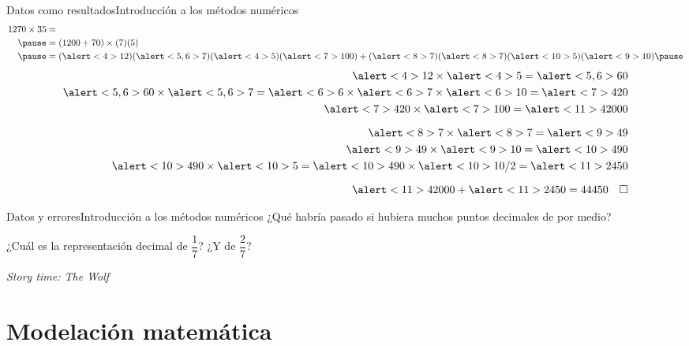 \documentclass[spanish, c]{beamer}
\begin{document}
\begin{frame}{Datos como resultados}{Introducción a los métodos numéricos}
    \begin{align*}
        1270 \times 35 & = \\ \pause
        & = (1200 + 70) \times (7)(5) \\ \pause
        & = (\alert<4>{12})(\alert<5,6>{7})(\alert<4>{5})(\alert<7>{100}) + (\alert<8>{7})(\alert<8>{7})(\alert<10>{5})(\alert<9>{10}) \pause
    \end{align*}
    \vspace{-2ex}
    \begin{align*}
        \alert<4>{12} \times \alert<4>{5} = \alert<5,6>{60} \\
        \alert<5,6>{60} \times \alert<5,6>{7} = \alert<6>{6} \times \alert<6>{7} \times \alert<6>{10} = \alert<7>{420} \\
        \alert<7>{420} \times \alert<7>{100} = \alert<11>{42000} \\[1.5ex]
        \alert<8>{7} \times \alert<8>{7} = \alert<9>{49} \\
        \alert<9>{49} \times \alert<9>{10} = \alert<10>{490} \\
        \alert<10>{490} \times \alert<10>{5} = \alert<10>{490} \times \alert<10>{10 / 2} = \alert<11>{2450}\\[1.5ex]
        \alert<11>{42000} + \alert<11>{2450} = 44450 \quad \square
    \end{align*}
\end{frame}

\begin{frame}{Datos y errores}{Introducción a los métodos numéricos}
    ¿Qué habría pasado si hubiera muchos puntos decimales de por medio? \pause

    \bigskip

    ¿Cuál es la representación decimal de $\dfrac{1}{7}$? ¿Y de $\dfrac{2}{7}$? \pause

    \bigskip

    \begin{center}
        \LARGE
        \textit{Story time: The Wolf}
    \end{center}    
\end{frame}

\section{Modelación matemática}
\end{document}
